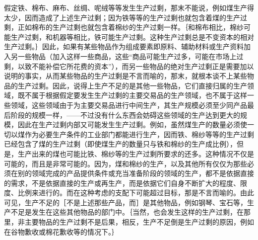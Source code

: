 假定铁、棉布、麻布、丝绸、呢绒等等发生生产过剩，那末不能说，例如煤生产得太少，因而造成了上述生产过剩；因为铁等等的生产过剩也就包含着煤的生产过剩，正如棉布的生产过剩也就包含着棉纱的生产过剩一样。｛和棉布相比，棉纱可能生产过剩，和机器等相比，铁可能生产过剩。这种生产过剩总是不变资本的相对生产过剩。｝因此，如果有某些物品作为组成要素即原料、辅助材料或生产资料加入另一些物品（加入这样一些商品，这些“商品可能生产过多，可能在市场上过剩，以致不能补偿它所花费的资本”），而另一些物品的绝对生产过剩正是需要加以说明的事实，从而某些物品的生产过剩是不言而喻的，那末，就根本谈不上某些物品的生产过剩。因此，说得上生产不足的是其他一些物品，它们直接归属的生产领域，既不属于根据假定要发生生产过剩的主要交易品的生产领域，也不属于这样一些领域，这些领域由于为主要交易品进行中间生产，其生产规模必须至少同产品最后阶段的规模一样，——不过没有什么东西会妨碍这些领域的生产达到更大的规模，因此在生产过剩内部又可能发生生产过剩。例如，虽然煤生产的数量必须使一切以煤作为必要生产条件的工业部门都能进行生产，因而铁、棉纱等等的生产过剩已经包含了煤的生产过剩（即使煤生产的数量只与铁和棉纱的生产成比例），但是，生产出来的煤也可能比铁、棉纱等的生产过剩所要求的还多。这种情况不仅是可能的，而且是非常可能的。因为，煤和棉纱的生产，以及其他所有仅仅为那些必须在别的领域完成的产品提供条件或充当准备阶段的领域的生产，都不是依据直接的需求，不是依据直接的生产或再生产，而是依据它们自身不断扩大的程度、限度、比例来进行的。而在这种考虑的支配下可能超过目标，那是不言而喻的。由此可见，生产不足的［不是上述那些产品，而］是其他物品，例如钢琴、宝石等，生产不足是发生在这些其他物品的部门中。｛当然，也会发生这样的生产过剩，在那里，非主要物品的生产过剩不是后果，相反，生产不足倒是生产过剩的原因，例如在谷物歉收或棉花歉收等的情况下。｝

